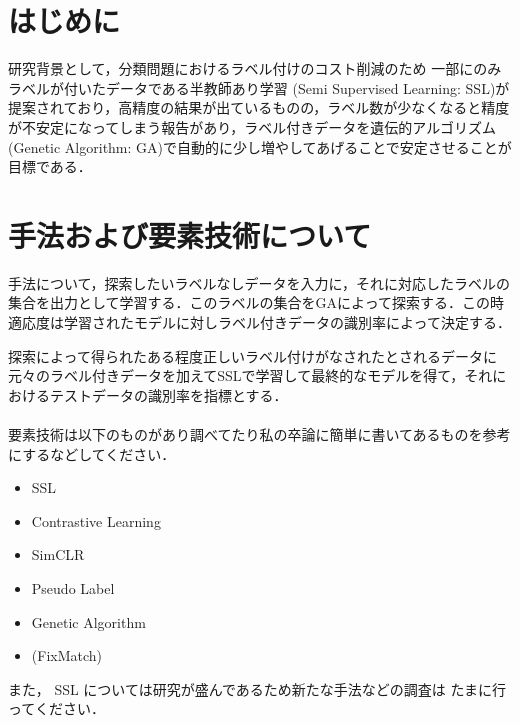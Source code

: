 \documentclass[twocolumn]{jarticle}     %
\begin{document}


\section{はじめに}
研究背景として，分類問題におけるラベル付けのコスト削減のため
一部にのみラベルが付いたデータである半教師あり学習
(Semi Supervised Learning: SSL)が提案されており，高精度の結果が出ているものの，ラベル数が少なくなると精度が不安定になってしまう報告があり，ラベル付きデータを遺伝的アルゴリズム(Genetic Algorithm: GA)で自動的に少し増やしてあげることで安定させることが目標である．

\section{手法および要素技術について}
手法について，探索したいラベルなしデータを入力に，それに対応したラベルの集合を出力として学習する．このラベルの集合をGAによって探索する．この時適応度は学習されたモデルに対しラベル付きデータの識別率によって決定する．

探索によって得られたある程度正しいラベル付けがなされたとされるデータに元々のラベル付きデータを加えてSSLで学習して最終的なモデルを得て，それにおけるテストデータの識別率を指標とする．\\
\\
要素技術は以下のものがあり調べてたり私の卒論に簡単に書いてあるものを参考にするなどしてください．
\begin{itemize}
	\item SSL
	\item Contrastive Learning
	\item SimCLR
	\item Pseudo Label
	\item Genetic Algorithm
	\item (FixMatch)
\end{itemize}
また， SSL については研究が盛んであるため新たな手法などの調査は
たまに行ってください．
\end{document}
